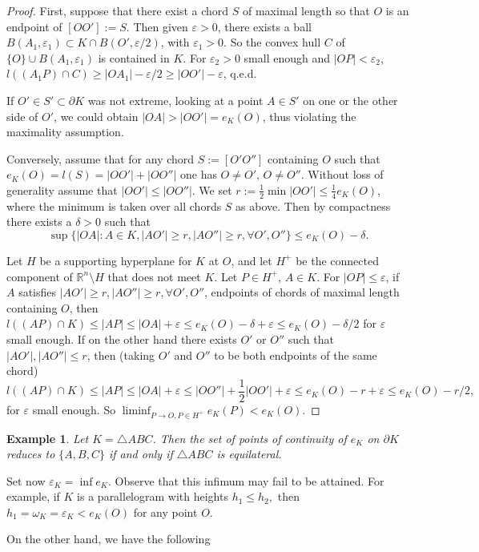 \documentclass[a4paper,12pt]{amsart}
\newtheorem{exam}[thm]{Example}
\def\R{\mathbb R}
\def\om{\omega}
\def\eps{\varepsilon}
\begin{document}
\begin{proof}
First, suppose that there exist a chord $S$ of maximal length so
that $O$ is an endpoint of $[OO']:=S$. Then given $\eps>0$, there
exists a ball $B(A_1,\eps_1) \subset K\cap B(O',\eps/2)$, with
$\eps_1>0$. So the convex hull $C$ of $\{O\} \cup B(A_1,\eps_1)$
is contained in $K$. For $\eps_2>0$ small enough and
$|OP|<\eps_2$, $l((A_1P)\cap C) \ge |OA_1|-\eps/2 \ge
|OO'|-\eps$, q.e.d.

If $O'\in S' \subset \partial K$ was not extreme, looking at a point $A\in S'$
on one or the other side of $O'$, we could obtain $|OA|>|OO'|=e_K(O)$, thus violating
the maximality assumption.

Conversely, assume that for any chord $S:=[O'O'']$  containing $O$
such that $e_K(O)= l(S)= |OO'|+|OO''|$ one has $O\neq O'$, $O\neq
O''$. Without loss of generality assume that $|OO'|\le |OO''|$. We
set $r:=\frac12 \min |OO'| \le \frac14 e_K(O)$, where the minimum
is taken over all chords $S$ as above. Then by compactness there
exists a $\delta
>0$ such that
\[
\sup \{ |OA| : A \in K, |AO'|\ge r, |AO''|\ge r, \forall O', O''\} \le e_K(O)-\delta.
\]


Let $H$ be a supporting hyperplane for $K$ at $O$, and let $H^+$ be the connected
component of $\R^n\setminus H$ that does not meet $K$. Let
$P \in H^+$, $A\in K$.
For $|OP|\le \eps$, if $A$ satisfies $|AO'|\ge r, |AO''|\ge r, \forall O', O''$,
endpoints of chords of maximal length containing $O$,
then $l((AP)\cap K) \le |AP| \le |OA|+\eps \le e_K(O)-\delta +\eps \le e_K(O)-\delta/2$
for $\eps$ small enough.
If on the other hand there exists $O'$ or $O''$ such that $|AO'|, |AO''| \le r$, then
(taking $O'$ and $O''$ to be both endpoints of the same chord)
$$
l((AP)\cap K) \le |AP| \le |OA|+\eps \le |OO''| + \frac12 |OO'| +\eps
\le e_K(O) - r +\eps \le e_K(O) - r/2,
$$
for $\eps$ small enough. So $\liminf_{P\to O, P \in H^+} e_K(P) < e_K(O)$.
\end{proof}
\begin{exam} Let $K=\triangle ABC$. Then the set of points of continuity
of $e_K$ on $\partial K$ reduces to $\{A,B,C\}$ if and only if $\triangle ABC$
is equilateral.
\end{exam}

Set now
$\eps_K=\inf e_K.$ Observe that this infimum may fail to be
attained. For example, if $K$ is a parallelogram with heights
$h_1\le h_2,$ then $h_1=\om_K=\eps_K<e_K(O)$ for any point $O.$

On the other hand, we have the following
\end{document}
